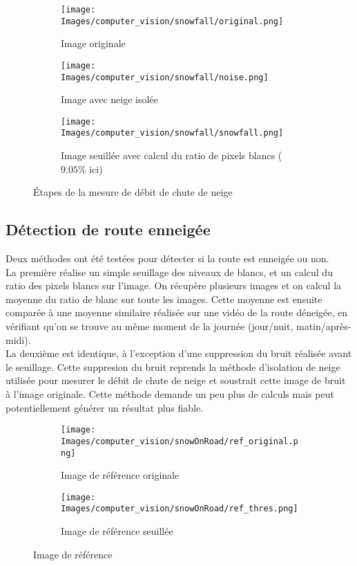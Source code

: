 \begin{figure}[H]
    \begin{subfigure}{.45\textwidth}
        \texttt{[image: Images/computer\_vision/snowfall/original.png]}
        \caption{Image originale}
        \label{fig:Snowfall_original}
    \end{subfigure}
    \hfill
    \begin{subfigure}{.45\textwidth}
        \texttt{[image: Images/computer\_vision/snowfall/noise.png]}
        \caption{Image avec neige isolée}
        \label{fig:Snowfall_noise}
    \end{subfigure}
    \hfill
    \centering
    \begin{subfigure}{.45\textwidth}
        \texttt{[image: Images/computer\_vision/snowfall/snowfall.png]}
        \caption{Image seuillée avec calcul du ratio de pixels blancs ($9.05\%$ ici)}
        \label{fig:Snowfall_thres}
    \end{subfigure}
    \caption{Étapes de la mesure de débit de chute de neige}
    \label{fig:Snowfall_algorithm}
\end{figure}
\newpage

\subsection{Détection de route enneigée} \label{snowOnRoad}
Deux méthodes ont été testées pour détecter si la route est enneigée ou non.\\
La première réalise un simple seuillage des niveaux de blancs, et un calcul
du ratio des pixels blancs sur l'image. On récupère plusieurs images et on
calcul la moyenne du ratio de blanc sur toute les images.
Cette moyenne est ensuite comparée à une moyenne similaire réalisée sur une
vidéo de la route déneigée, en vérifiant qu'on se trouve au même moment de
la journée (jour/nuit, matin/après-midi).\\
La deuxième est identique, à l'exception d'une suppression du bruit réalisée
avant le seuillage. Cette suppresion du bruit reprends la méthode d'isolation
de neige utilisée pour mesurer le débit de chute de neige et soustrait cette image
de bruit à l'image originale. Cette méthode demande un peu plus de calculs mais peut
potentiellement générer un résultat plus fiable.

\begin{figure}[H]
    \begin{subfigure}{.45\textwidth}
        \texttt{[image: Images/computer\_vision/snowOnRoad/ref\_original.png]}
        \caption{Image de référence originale}
        \label{fig:SnowOnRoad_ref_original}
    \end{subfigure}
    \hfill
    \begin{subfigure}{.45\textwidth}
        \texttt{[image: Images/computer\_vision/snowOnRoad/ref\_thres.png]}
        \caption{Image de référence seuillée}
        \label{fig:SnowOnRoad_ref_thres}
    \end{subfigure}
    \caption[Référence pour détection de neige sur route]{Image de référence}
    \label{fig:SnowOnRoad_ref}
\end{figure}

